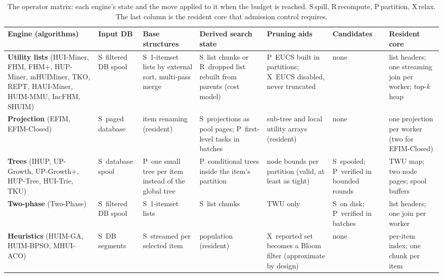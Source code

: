 \documentclass[conference]{IEEEtran}
\begin{document}
\setlength{\fboxsep}{1.2pt}
\newcommand{\mS}[1]{\colorbox{blue!8}{S}~#1}
\newcommand{\mR}[1]{\colorbox{green!10}{R}~#1}
\newcommand{\mP}[1]{\colorbox{yellow!20}{P}~#1}
\newcommand{\mX}[1]{\colorbox{magenta!10}{X}~#1}
\begin{table}[t]
\centering
\caption{The operator matrix: each engine's state and the move applied to it when the budget is
reached. \colorbox{blue!8}{S}\,spill, \colorbox{green!10}{R}\,recompute,
\colorbox{yellow!20}{P}\,partition, \colorbox{magenta!10}{X}\,relax. The last column is the
resident core that admission control requires.}
\label{tab:matrix}
\scriptsize
\setlength{\tabcolsep}{3pt}
\renewcommand{\arraystretch}{1.25}
\begin{tabular}{@{}*{7}{>{\raggedright\arraybackslash}p{2.25cm}}@{}}
\toprule
Engine (algorithms) & Input DB & Base structures & Derived search state & Pruning aids & Candidates & Resident core \\
\midrule
\textbf{Utility lists} (HUI-Miner, FHM, FHM+, HUP-Miner, mHUIMiner, TKO, REPT, HAUI-Miner, HUIM-MMU, IncFHM, SHUIM)
& \mS{filtered DB spool}
& \mS{1-itemset lists by external sort, multi-pass merge}
& \mS{list chunks} or \mR{dropped list rebuilt from parents (cost model)}
& \mP{EUCS built in partitions}; \mX{EUCS disabled, never truncated}
& none
& list headers; one streaming join per worker; top-$k$ heap \\
\textbf{Projection} (EFIM, EFIM-Closed)
& \mS{paged database}
& item renaming (resident)
& \mS{projections as pool pages}; \mP{first-level tasks in batches}
& sub-tree and local utility arrays (resident)
& none
& one projection per worker (two for EFIM-Closed) \\
\textbf{Trees} (IHUP, UP-Growth, UP-Growth+, HUP-Tree, HUI-Trie, TKU)
& \mS{database spool}
& \mP{one small tree per item instead of the global tree}
& \mP{conditional trees inside the item's partition}
& node bounds per partition (valid, at least as tight)
& \mS{spooled}; \mP{verified in bounded rounds}
& TWU map; two node pages; spool buffers \\
\textbf{Two-phase} (Two-Phase)
& \mS{filtered DB spool}
& \mS{1-itemset lists}
& \mS{list chunks}
& TWU only
& \mS{on disk}; \mP{verified in batches}
& list headers; one join per worker \\
\textbf{Heuristics} (HUIM-GA, HUIM-BPSO, MHUI-ACO)
& \mS{DB segments}
& \mS{streamed per selected item}
& population (resident)
& \mX{reported set becomes a Bloom filter (approximate by design)}
& none
& per-item index; one chunk per item \\
\bottomrule
\end{tabular}
\end{table}
\end{document}

